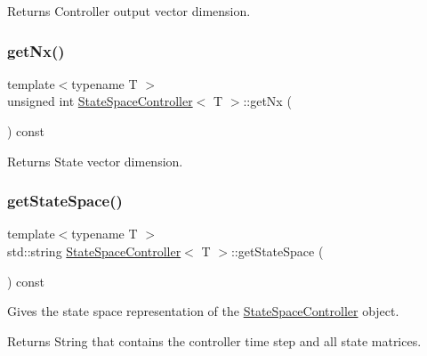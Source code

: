 \begin{DoxyReturn}{Returns}
Controller output vector dimension. 
\end{DoxyReturn}
\mbox{\label{classStateSpaceController_ae60e8d45a68c0510a3b9b1f9fef144bb}} 
\subsubsection{\texorpdfstring{get\+Nx()}{getNx()}}
{\footnotesize\ttfamily template$<$typename T $>$ \\
unsigned int \hyperlink{classStateSpaceController}{State\+Space\+Controller}$<$ T $>$\+::get\+Nx (\begin{DoxyParamCaption}{ }\end{DoxyParamCaption}) const}

\begin{DoxyReturn}{Returns}
State vector dimension. 
\end{DoxyReturn}
\mbox{\label{classStateSpaceController_a40a127a65a4ac83f8390ce28cd246d28}} 
\subsubsection{\texorpdfstring{get\+State\+Space()}{getStateSpace()}}
{\footnotesize\ttfamily template$<$typename T $>$ \\
std\+::string \hyperlink{classStateSpaceController}{State\+Space\+Controller}$<$ T $>$\+::get\+State\+Space (\begin{DoxyParamCaption}{ }\end{DoxyParamCaption}) const}



Gives the state space representation of the \hyperlink{classStateSpaceController}{State\+Space\+Controller} object. 

\begin{DoxyReturn}{Returns}
String that contains the controller time step and all state matrices. 
\end{DoxyReturn}
\mbox{\label{classStateSpaceController_a6bb6da64c47f0c54dd1de17030f694a4}} 
